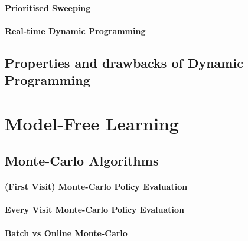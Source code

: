 		\paragraph{Prioritised Sweeping} %
			\label{par:prioritised_sweeping}
		

		\paragraph{Real-time Dynamic Programming} %
			\label{par:real_time_dynamic_programming}
		

	
	\subsection{Properties and drawbacks of Dynamic Programming} %
		\label{sub:properties_and_drawbacks_of_dynamic_programming}
	


\section{Model-Free Learning} %
	\label{sec:model_free_learning}

	\subsection{Monte-Carlo Algorithms} %
		\label{sub:monte_carlo_algorithm}

		\paragraph*{(First Visit) Monte-Carlo Policy Evaluation}

		\paragraph*{Every Visit Monte-Carlo Policy Evaluation}


		\paragraph*{Batch vs Online Monte-Carlo}

